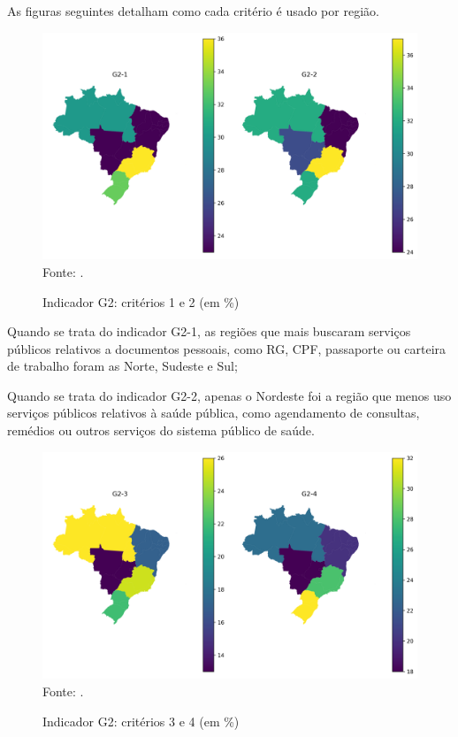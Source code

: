 As figuras seguintes detalham como cada critério é usado por região.

\begin{figure}[H]
	\centering
	\caption{Indicador G2: critérios 1 e 2 (em \%)}
	\includegraphics[width=1\linewidth]{figuras/mapa_coropletico_tic_domicilios_2024_g2_1_2.png}
	\label{fig:mapa_coropletico_tic_domicilios_2024_g2_1_2}
	\footnotesize{Fonte: \cite{tic_domicilios_2024_g2}.}
\end{figure}

Quando se trata do indicador G2-1, as regiões que mais buscaram serviços públicos relativos a documentos pessoais, como RG, CPF, passaporte ou carteira de trabalho foram as Norte, Sudeste e Sul;

Quando se trata do indicador G2-2, apenas o Nordeste foi a região que menos uso serviços públicos relativos à saúde pública, como agendamento de consultas, remédios ou outros serviços do sistema público de saúde.

\begin{figure}[H]
	\centering
	\caption{Indicador G2: critérios 3 e 4 (em \%)}
	\includegraphics[width=1\linewidth]{figuras/mapa_coropletico_tic_domicilios_2024_g2_3_4.png}
	\label{fig:mapa_coropletico_tic_domicilios_2024_g2_3_4}
	\footnotesize{Fonte: \cite{tic_domicilios_2024_g2}.}
\end{figure}

